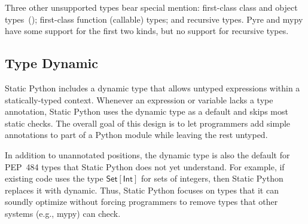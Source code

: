 \documentclass[english,cleveref,crc]{programming}
\newcommand{\SP}{Static Python}
\newcommand{\PEP}{PEP~484}
\newcommand{\typefont}[1]{\mathsf{#1}}
\newcommand{\paramtype}[2]{#1[#2]}
\newcommand{\sptint}{\typefont{Int}}
\newcommand{\sptset}[1]{\paramtype{\typefont{Set}}{#1}}
\begin{document}
Three other unsupported types bear special mention:
first-class class and object types~();
first-class function (callable) types; and
recursive types.
Pyre and mypy have some support for the first two kinds, but no support for recursive types.


\subsection{Type Dynamic}
\label{s:type-dynamic}

\SP{} includes a dynamic type that allows untyped expressions within a
statically-typed context.
Whenever an expression or variable lacks a type annotation, \SP{} uses the
dynamic type as a default and skips most static checks.
The overall goal of this design is to let programmers add simple annotations to
part of a Python module while leaving the rest untyped.

In addition to unannotated positions, the dynamic type is also the default for
\PEP{} types that \SP{} does not yet understand.
For example, if existing code uses the type $\sptset{\sptint}$ for sets of integers,
then \SP{} replaces it with dynamic.
Thus, \SP{} focuses on types that it can soundly optimize without forcing
programmers to remove types that other systems (e.g., mypy) can check.
\end{document}
